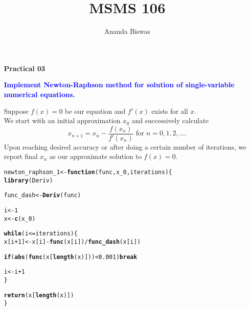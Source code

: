 \documentclass[11pt, a4paper]{article}\usepackage[]{graphicx}\usepackage[]{xcolor}
\title{MSMS 106}
\author{Ananda Biswas}
\date{}
\makeatletter
\newcommand{\hlnum}[1]{\textcolor[rgb]{0.686,0.059,0.569}{#1}}%
\newcommand{\hlopt}[1]{\textcolor[rgb]{0,0,0}{#1}}%
\newcommand{\hldef}[1]{\textcolor[rgb]{0.345,0.345,0.345}{#1}}%
\newcommand{\hlkwa}[1]{\textcolor[rgb]{0.161,0.373,0.58}{\textbf{#1}}}%
\newcommand{\hlkwb}[1]{\textcolor[rgb]{0.69,0.353,0.396}{#1}}%
\newcommand{\hlkwc}[1]{\textcolor[rgb]{0.333,0.667,0.333}{#1}}%
\newcommand{\hlkwd}[1]{\textcolor[rgb]{0.737,0.353,0.396}{\textbf{#1}}}%
\newenvironment{kframe}{%
 \def\at@end@of@kframe{}%
 \ifinner\ifhmode%
  \def\at@end@of@kframe{\end{minipage}}%
  \begin{minipage}{\columnwidth}%
 \fi\fi%
 \def\FrameCommand##1{\hskip\@totalleftmargin \hskip-\fboxsep
 \colorbox{shadecolor}{##1}\hskip-\fboxsep
     \hskip-\linewidth \hskip-\@totalleftmargin \hskip\columnwidth}%
 \MakeFramed {\advance\hsize-\width
   \@totalleftmargin\z@ \linewidth\hsize
   \@setminipage}}%
 {\par\unskip\endMakeFramed%
 \at@end@of@kframe}
\newenvironment{knitrout}{}{} %
\makeatother
\begin{document}
\maketitle

\begin{center}
\textbf{Practical 03}
\end{center}

\smallpencil \hspace{0.5cm} \textcolor{blue}{\textbf{Implement Newton-Raphson method for solution of single-variable numerical equations.}}

\vspace{0.5cm}

\faArrowAltCircleRight[regular] \hspace{0.5cm} Suppose $f(x) = 0$ be our equation and $f'(x)$ exists for all $x$. \\

We start with an initial approximation $x_0$ and successively calculate $$x_{n+1} = x_n - \dfrac{f(x_n)}{f'(x_n)} \,\, \text{for} \,\, n = 0, 1, 2, \ldots.$$ Upon reaching desired accuracy or after doing a certain number of iterations, we report final $x_n$ as our approximate solution to $f(x) = 0$.

\begin{knitrout}
\color{fgcolor}\begin{kframe}
\begin{alltt}
\hldef{newton_raphson_1} \hlkwb{<-} \hlkwa{function}\hldef{(}\hlkwc{func}\hldef{,} \hlkwc{x_0}\hldef{,} \hlkwc{iterations}\hldef{)\{}
  \hlkwd{library}\hldef{(Deriv)}

  \hldef{func_dash} \hlkwb{<-} \hlkwd{Deriv}\hldef{(func)}

  \hldef{i} \hlkwb{<-} \hlnum{1}
  \hldef{x} \hlkwb{<-} \hlkwd{c}\hldef{(x_0)}

  \hlkwa{while}\hldef{(i} \hlopt{<=} \hldef{iterations)\{}
    \hldef{x[i}\hlopt{+}\hlnum{1}\hldef{]} \hlkwb{<-} \hldef{x[i]} \hlopt{-} \hlkwd{func}\hldef{(x[i])} \hlopt{/} \hlkwd{func_dash}\hldef{(x[i])}

    \hlkwa{if}\hldef{(}\hlkwd{abs}\hldef{(}\hlkwd{func}\hldef{(x[}\hlkwd{length}\hldef{(x)]))} \hlopt{<} \hlnum{0.001}\hldef{)} \hlkwa{break}

    \hldef{i} \hlkwb{<-} \hldef{i} \hlopt{+} \hlnum{1}
  \hldef{\}}

  \hlkwd{return}\hldef{(x[}\hlkwd{length}\hldef{(x)])}
\hldef{\}}
\end{alltt}
\end{kframe}
\end{knitrout}
\end{document}
